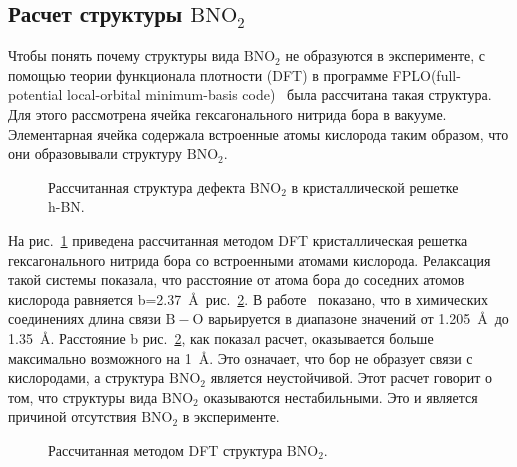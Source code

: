 \subsection{Расчет структуры \textbf{$\mathrm{BNO_2}$}}

Чтобы понять почему структуры вида $\mathrm{BNO_2}$ не образуются в эксперименте, с помощью  теории функционала плотности (DFT) в программе
FPLO(full-potential local-orbital minimum-basis code)~\cite{Koepernik1999} была рассчитана такая структура. Для этого рассмотрена ячейка гексагонального 
нитрида бора в вакууме. Элементарная ячейка содержала встроенные атомы кислорода таким образом, что они образовывали структуру $\mathrm{BNO_2}$. 
\begin{figure}[!ht]
\begin{minipage}[h]{0.49\linewidth}
\end{minipage}
\hfill
\begin{minipage}[!ht]{0.49\linewidth}
\end{minipage}
\caption{Рассчитанная структура дефекта $\mathrm{BNO_2}$ в кристаллической решетке h-BN.}
\label{BNO2_relaxed}
\end{figure}
На рис.~\ref{BNO2_relaxed} приведена рассчитанная методом DFT кристаллическая решетка гексагонального нитрида бора 
со встроенными атомами кислорода. 
Релаксация такой системы показала, что расстояние от атома бора до соседних атомов кислорода равняется b=2.37~\AA~рис.~\ref{pic:BNO2_B_height}. В работе~\cite{Coulson1968} показано, что в химических соединениях длина связи $\mathrm{B-O}$ варьируется в 
диапазоне значений от 1.205~\AA~до 1.35~\AA. Расстояние b рис.~\ref{pic:BNO2_B_height}, как показал расчет, 
оказывается больше максимально возможного на 1~\AA. Это означает, что бор не образует связи с кислородами, а 
структура $\mathrm{BNO_2}$ является неустойчивой. Этот расчет говорит о том, что структуры вида $\mathrm{BNO_2}$ 
оказываются нестабильными. Это и является причиной отсутствия $\mathrm{BNO_2}$ в эксперименте.
\begin{figure}[!ht]
\caption{Рассчитанная методом DFT структура $\mathrm{BNO_2}$.}
\label{pic:BNO2_B_height}
\end{figure}



\clearpage
